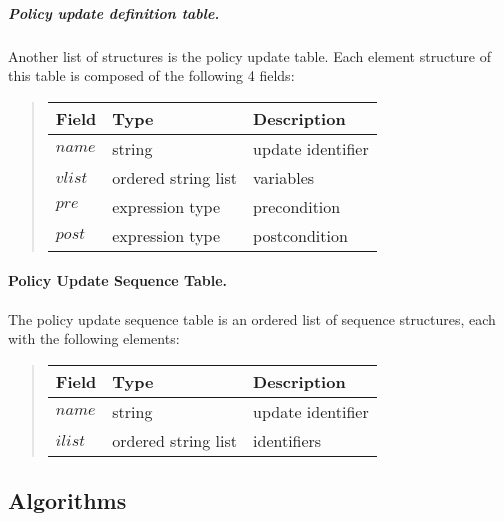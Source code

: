 \documentclass[10pt, twocolumn]{article}
\begin{document}
          \subparagraph{Policy update definition table.}

            Another list of structures is the policy update table. Each element
            structure of this table is composed of the following 4 fields:

            \begin{quote}
              \begin{tabular}[t]{|l|l|l|}
                \hline
                \textbf{Field} & \textbf{Type} & \textbf{Description} \\
                \hline
                $name$ & string & update identifier \\
                \hline
                $vlist$ & ordered string list & variables \\
                \hline
                $pre$ & expression type & precondition \\
                \hline
                $post$ & expression type & postcondition \\
                \hline
              \end{tabular}
            \end{quote}

        \paragraph{Policy Update Sequence Table.}

          The policy update sequence table is an ordered list of sequence
          structures, each with the following elements:

          \begin{quote}
            \begin{tabular}[t]{|l|l|l|}
              \hline
              \textbf{Field} & \textbf{Type} & \textbf{Description} \\
              \hline
              $name$ & string & update identifier \\
              \hline
              $ilist$ & ordered string list & identifiers \\
              \hline
            \end{tabular}
          \end{quote}

    \subsection{Algorithms}
\end{document}
